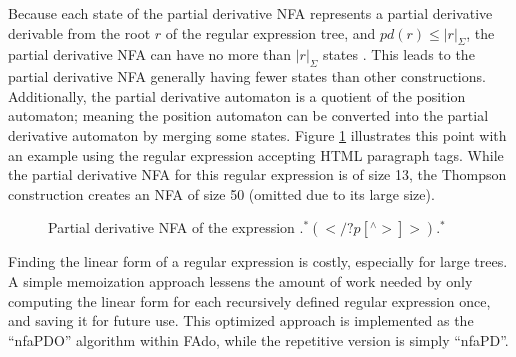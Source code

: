 Because each state of the partial derivative NFA represents a partial derivative derivable from the root $r$ of the regular expression tree, and $pd(r) \leq |r|_\Sigma$, the partial derivative NFA can have no more than $|r|_\Sigma$ states \cite{Antimirov}. This leads to the partial derivative NFA generally having fewer states than other constructions. Additionally, the partial derivative automaton is a quotient of the position automaton; meaning the position automaton can be converted into the partial derivative automaton by merging some states. Figure \ref{fig:nfaPD p tag} illustrates this point with an example using the regular expression accepting HTML paragraph tags. While the partial derivative NFA for this regular expression is of size 13, the Thompson construction creates an NFA of size 50 (omitted due to its large size).

\begin{figure}[H]
  \centering
  \caption{Partial derivative NFA of the expression $.^*(</?p[^\wedge >]>).^*$}
  \label{fig:nfaPD p tag}
\end{figure}

Finding the linear form of a regular expression is costly, especially for large trees. A simple memoization approach lessens the amount of work needed by only computing the linear form for each recursively defined regular expression once, and saving it for future use. This optimized approach is implemented as the ``nfaPDO'' algorithm within FAdo, while the repetitive version is simply ``nfaPD''.

